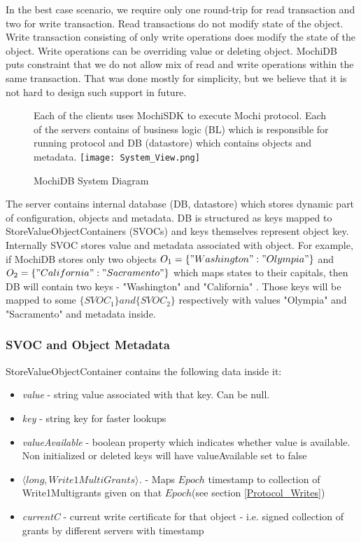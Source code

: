 \documentclass[letterpaper,twocolumn,10pt]{article}
\begin{document}
In the best case scenario, we require only one round-trip for read transaction and two for write transaction. Read transactions do not modify state of the object. Write transaction consisting of only write operations does modify the state of the object. Write operations can be overriding value or deleting object. MochiDB puts constraint that we do not allow mix of read and write operations within the same transaction. That was done mostly for simplicity, but we believe that it is not hard to design such support in future.

\begin{figure}
\caption{MochiDB System Diagram}
\small
Each of the clients uses MochiSDK to execute Mochi protocol. Each of the servers contains of business logic (BL) which is responsible for running protocol and DB (datastore) which contains objects and metadata.
\centering
\texttt{[image: System\_View.png]}
\label{fig:system_view}
\end{figure}

The server contains internal database (DB, datastore) which stores dynamic part of configuration, objects and metadata. DB is structured as keys mapped to StoreValueObjectContainers (SVOCs) and keys themselves represent object key. 
Internally SVOC stores value and metadata associated with object. For example, if MochiDB stores only two objects \(O_{1} = \{ "Washington":"Olympia" \} \) and \(O_{2} = \{ "California" : "Sacramento"\} \) which maps states to their capitals, then DB will contain two keys - {"Washington" and "California" }. Those keys will be mapped to some \( \{ SVOC_{1} \} and \{ SVOC_{2} \} \) respectively with values "Olympia" and "Sacramento" and metadata inside.

\subsubsection{SVOC and Object Metadata}
StoreValueObjectContainer contains the following data inside it:
\begin{itemize}[noitemsep, topsep=0pt,]
  \item \textit{value} - string value associated with that key. Can be null.
  \item  \textit{key} - string key for faster lookups
  \item  \textit{valueAvailable} - boolean property which indicates whether value is available. Non initialized or deleted keys will have valueAvailable set to false
  \item \textit{$\langle long, Write1MultiGrants \rangle$.} - Maps $Epoch$ timestamp to collection of Write1Multigrants given on that $Epoch$(see section \ref{Protocol_Writes})
  \item \textit{currentC} - current write certificate for that object - i.e. signed collection of grants by different servers with timestamp
\end{itemize}
\end{document}
